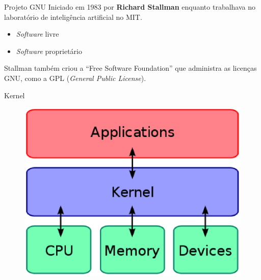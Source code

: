 \documentclass[size=14pt,
style=paintings
]{powerdot}
\newenvironment{vslide}{\vspace{\stretch{1}}}{\vspace{\stretch{1}}}
\begin{document}
\begin{slide}{Projeto GNU}
\begin{vslide}
Iniciado em 1983 por \textbf{Richard Stallman} enquanto trabalhava no laboratório de inteligência artificial no MIT.

\vspace{0.5cm}
\begin{itemize}
\item \textit{Software} livre
\item \textit{Software} proprietário
\end{itemize}

\vspace{0.5cm}
Stallman também criou a ``Free Software Foundation'' que administra as licenças GNU, como a GPL (\textit{General Public License}).
\end{vslide}
\end{slide}

\begin{slide}{Kernel}


   \begin{figure}[!h]
  \includegraphics[scale=.8]{kernel1}  
   \end{figure}

\end{slide}
\end{document}
